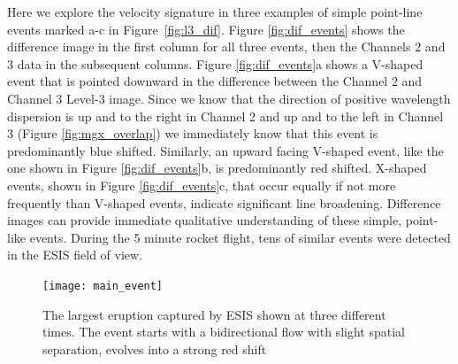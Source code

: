     	Here we explore the velocity signature in three examples of simple point-line events marked a-c in Figure~\ref{fig:l3_dif}.  Figure \ref{fig:dif_events} shows the difference image in the first column for all three events, then the Channels 2 and 3 data in the subsequent columns. Figure \ref{fig:dif_events}a shows a V-shaped event that is pointed downward in the difference between the Channel 2 and Channel 3 Level-3 image.
    	Since we know that the direction of positive wavelength dispersion is up and to the right in Channel 2 and up and to the left in Channel 3 (Figure \ref{fig:mgx_overlap}) we immediately know that this event is predominantly blue shifted.  
    	Similarly, an upward facing V-shaped event, like the one shown in Figure \ref{fig:dif_events}b, is predominantly red shifted.
    	X-shaped events, shown in Figure \ref{fig:dif_events}c, that occur equally if not more frequently than V-shaped events, indicate significant line broadening. 
    	Difference images can provide immediate qualitative understanding of these simple, point-like events.  During the 5 minute rocket flight, tens of similar events were detected in the ESIS field of view.  
    	
    	
    	\begin{figure}[htb!]
    		\texttt{[image: main\_event]}
    		\centering
    		\caption{The largest eruption captured by ESIS shown at three different times. The event starts with a bidirectional flow with slight spatial separation, evolves into a strong red shift }
    		\label{fig:main_event}
    	\end{figure}
		
